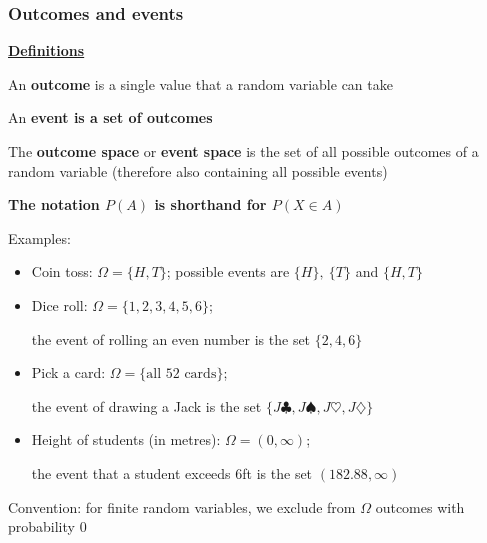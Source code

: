 \documentclass[t,8pt]{beamer}%
\begin{document}
    \begin{frame}
		\frametitle{Outcomes and events}
		{\bf\underline{Definitions}} \par
        An {\bf outcome} is a single value that a random variable can take \par
        An {\bf event is a set of outcomes} \par
        The {\bf outcome space} or {\bf event space} is the set of all possible outcomes of a random variable (therefore also containing all possible events) \par
        {\bf The notation $P(A)$ is shorthand for $P(X\in A)$} \par
        Examples:
        \begin{itemize}
            \item Coin toss: $\Omega=\{H,T\}$; possible events are $\{H\},\ \{T\}$ and $\{H,T\}$
            \item Dice roll: $\Omega=\{1,2,3,4,5,6\}$; \par
            the event of rolling an even number is the set $\{2,4,6\}$
            \item Pick a card: $\Omega=\{\text{all $52$ cards}\}$; \par
            the event of drawing a Jack is the set $\{J\clubsuit,J\spadesuit,J\heartsuit,J\diamondsuit\}$
            \item Height of students (in metres): $\Omega=(0,\infty)$; \par
            the event that a student exceeds $6$ft is the set $(182.88,\infty)$
        \end{itemize}
        Convention: for finite random variables, we exclude from $\Omega$ outcomes with probability $0$
	\end{frame}
\end{document}

